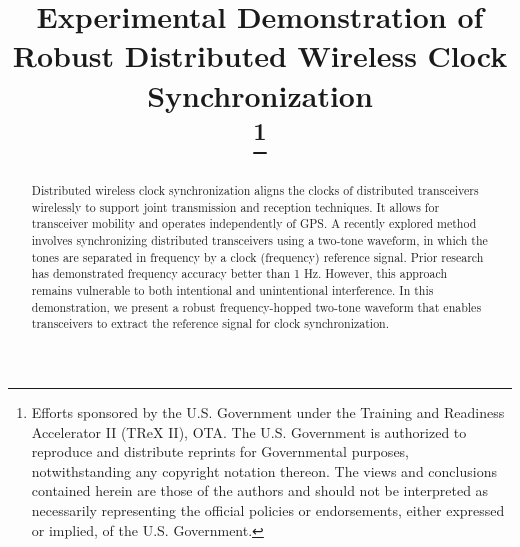 \documentclass[conference]{IEEEtran}
\begin{document}
\title{Experimental Demonstration of Robust Distributed Wireless Clock Synchronization \\
\thanks{Efforts sponsored by the U.S. Government under the Training and Readiness Accelerator II (TReX II), OTA. The U.S. Government is authorized to reproduce and distribute reprints for Governmental purposes, notwithstanding any copyright notation thereon. The views and conclusions contained herein are those of the authors and should not be interpreted as necessarily representing the official policies or endorsements, either expressed or implied, of the U.S. Government.}
}

\author{
           \vspace{-1cm}
         }

\maketitle
\begin{abstract}
Distributed wireless clock synchronization aligns the clocks of distributed transceivers wirelessly to support joint transmission and reception techniques. It allows for transceiver mobility and operates independently of GPS. A recently explored method involves synchronizing distributed transceivers using a two-tone waveform, in which the tones are separated in frequency by a clock (frequency) reference signal. Prior research has demonstrated frequency accuracy better than 1 Hz. However, this approach remains vulnerable to both intentional and unintentional interference. In this demonstration, we present a robust frequency-hopped two-tone waveform that enables transceivers to extract the reference signal for clock synchronization. 
\end{abstract}
\end{document}
